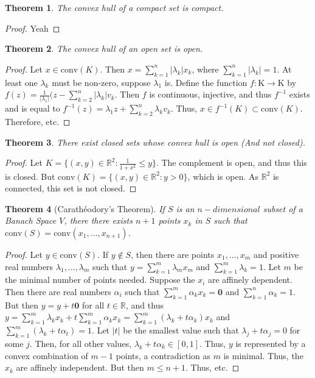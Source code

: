 \documentclass[oneside]{book}
\newtheorem{theorem}{Theorem}[section]
\theoremstyle{definition}
\newcommand*\B[1]{\mathbf{#1}}
\begin{document}
\begin{theorem}
The convex hull of a compact set is compact.
\end{theorem}
\begin{proof}
Yeah
\end{proof}

\begin{theorem}
The convex hull of an open set is open.
\end{theorem}
\begin{proof}
Let $x\in \textrm{conv}(K)$. Then $x=\sum_{k=1}^{n}|\lambda_k| x_k$, where $\sum_{k=1}^{n}|\lambda_k| = 1$. At least one $\lambda_k$ must be non-zero, suppose $\lambda_1$ is. Define the function $f:\textrm{K}\rightarrow \textrm{K}$ by $f(z) = \frac{1}{|\lambda_1|}(z-\sum_{k=2}^{n}|\lambda_k|v_k$. Then $f$ is continuous, injective, and thus $f^{-1}$ exists and is equal to $f^{-1}(z) = \lambda_1 z +\sum_{k=2}^{n}\lambda_k v_k$. Thus, $x\in f^{-1}(K)\subset\textrm{conv}(K)$. Therefore, etc. 
\end{proof}

\begin{theorem}
There exist closed sets whose convex hull is open (And not closed).
\end{theorem}
\begin{proof}
Let $K = \{(x,y)\in \mathbb{R}^2:\frac{1}{1+x^2}\leq y\}$. The complement is open, and thus this is closed. But $\textrm{conv}(K) = \{(x,y)\in \mathbb{R}^2:y>0\}$, which is open. As $\mathbb{R}^2$ is connected, this set is not closed.
\end{proof}

\begin{theorem}[Carath\'{e}odory's Theorem]
If $S$ is an $n-dimensional$ subset of a Banach Space $V$, there there exists $n+1$ points $x_k$ in $S$ such that $\textrm{conv}(S) = \textrm{conv}(x_1,\hdots, x_{n+1})$.
\end{theorem}
\begin{proof}
Let $y\in \textrm{conv}(S)$. If $y\notin S$, then there are points $x_1,\hdots, x_m$ and positive real numbers $\lambda_1,\hdots, \lambda_m$ such that $y=\sum_{k=1}^{m}\lambda_m x_m$ and $\sum_{k=1}^{m}\lambda_k = 1$. Let $m$ be the minimal number of points needed. Suppose the $x_i$ are affinely dependent. Then there are real numbers $\alpha_i$ such that $\sum_{k=1}^{m}\alpha_k x_k = \B{0}$ and $\sum_{k=1}^{n}\alpha_k =1$. But then $y = y+t\B{0}$ for all $t\in \mathbb{R}$, and thus $y = \sum_{k=1}^{m}\lambda_k x_k + t\sum_{k=1}^{m}\alpha_k x_k = \sum_{k=1}^{m}(\lambda_k + t\alpha_k)x_k$ and $\sum_{k=1}^{m}(\lambda_k+t\alpha_t) = 1$. Let $|t|$ be the smallest value such that $\lambda_j + t\alpha_j = 0$ for some $j$. Then, for all other values, $\lambda_k + t\alpha_k \in [0,1]$. Thus, $y$ is represented by a convex combination of $m-1$ points, a contradiction as $m$ is minimal. Thus, the $x_k$ are affinely independent. But then $m \leq n+1$. Thus, etc.
\end{proof}
\end{document}
